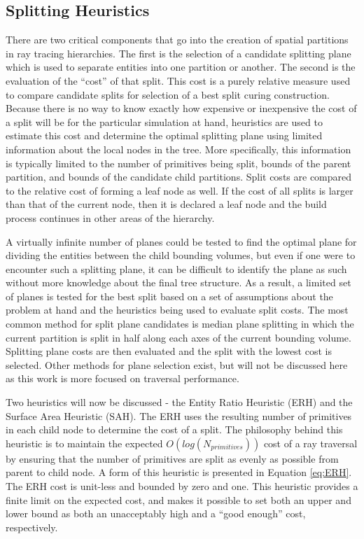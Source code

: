 \subsection{Splitting Heuristics}\label{sec:heuristics}

There are two critical components that go into the creation of spatial
partitions in ray tracing hierarchies. The first is the selection of a candidate
splitting plane which is used to separate entities into one partition or
another. The second is the evaluation of the ``cost'' of that split. This cost
is a purely relative measure used to compare candidate splits for selection of a
best split curing construction. Because there is no way to know exactly how
expensive or inexpensive the cost of a split will be for the particular
simulation at hand, heuristics are used to estimate this cost and determine the
optimal splitting plane using limited information about the local nodes in the
tree. More specifically, this information is typically limited to the number of
primitives being split, bounds of the parent partition, and bounds of the
candidate child partitions. Split costs are compared to the relative cost of
forming a leaf node as well. If the cost of all splits is larger than that of
the current node, then it is declared a leaf node and the build process
continues in other areas of the hierarchy.

A virtually infinite number of planes could be tested to find the optimal plane for
dividing the entities between the child bounding volumes, but even if one were to
encounter such a splitting plane, it can be difficult to identify the plane as
such without more knowledge about the final tree structure. As a result, a
limited set of planes is tested for the best split based on a set of assumptions
about the problem at hand and the heuristics being used to evaluate split
costs. The most common method for split plane candidates is median plane
splitting in which the current partition is split in half along each axes of the
current bounding volume. Splitting plane costs are then evaluated and the split
with the lowest cost is selected. Other methods for plane selection exist, but
will not be discussed here as this work is more focused on traversal performance.

Two heuristics will now be discussed - the Entity Ratio Heuristic (ERH) and the
Surface Area Heuristic (SAH). The ERH uses the resulting number of primitives in
each child node to determine the cost of a split. The philosophy behind this
heuristic is to maintain the expected $O(log(N_{primitives}))$ cost of a ray
traversal by ensuring that the number of primitives are split as evenly as possible from
parent to child node. A form of this heuristic is presented in Equation
\eqref{eq:ERH}. The ERH cost is unit-less and bounded by zero and one. This
heuristic provides a finite limit on the expected cost, and makes it possible to
set both an upper and lower bound as both an unacceptably high and a ``good enough''
cost, respectively.

